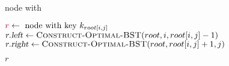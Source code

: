 
\begin{algorithm}[H]
  \begin{algorithmic}[1]
	\State \Return node with 
      \EndIf

      \hStatex
      \State $\textcolor{purple}{r} \gets \text{ node with key } k_{root[i,j]}$
      \State $r.\textsl{left} \gets \Call{Construct-Optimal-BST}{root, i, root[i,j]-1}$
      \State $r.\textsl{right} \gets \Call{Construct-Optimal-BST}{root, root[i,j]+1, j}$

      \hStatex
      \State \Return $r$
    \EndProcedure
  \end{algorithmic}
\end{algorithm}
